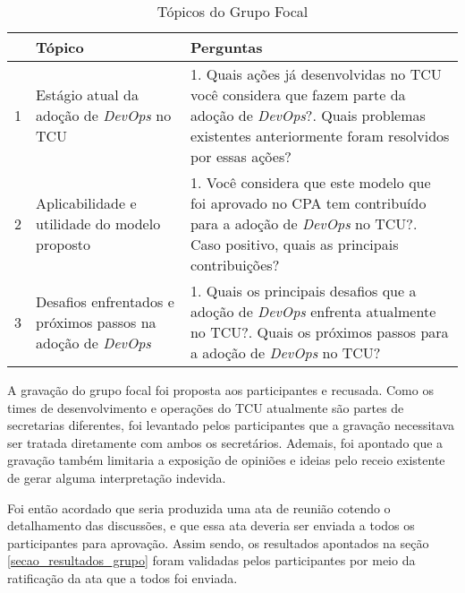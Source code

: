 \begin{table}[hb!]
\centering
\label{tabela_topicos}
\begin{tabular}{|p{0.3cm}|p{6.4cm}|p{7cm}|} \hline
& \textbf{Tópico} & \textbf{Perguntas} \\ \hline

1 & Estágio atual da adoção de {\it DevOps} no \acrshort{TCU} &
1. Quais ações já desenvolvidas no \acrshort{TCU} você considera que fazem parte da adoção de {\it DevOps}?\newline\newline
2. Quais problemas existentes anteriormente foram resolvidos por essas ações? \\ \hline

2 & Aplicabilidade e utilidade do modelo proposto &
1. Você considera que este modelo que foi aprovado no \acrshort{CPA} tem contribuído para a adoção de {\it DevOps} no \acrshort{TCU}?\newline\newline
2. Caso positivo, quais as principais contribuições? \\ \hline

3 & Desafios enfrentados e próximos passos na adoção de {\it DevOps} &
1. Quais os principais desafios que a adoção de {\it DevOps} enfrenta atualmente no \acrshort{TCU}?\newline\newline
2. Quais os próximos passos para a adoção de {\it DevOps} no \acrshort{TCU}?\\ \hline

\end{tabular}
\caption{Tópicos do Grupo Focal}
\end{table}

A gravação do grupo focal foi proposta aos participantes e recusada.
Como os times de desenvolvimento e operações do \acrshort{TCU} atualmente são
partes de secretarias diferentes, foi levantado pelos participantes que a
gravação necessitava ser tratada diretamente com ambos os secretários. Ademais,
foi apontado que a gravação também limitaria a exposição de opiniões e ideias
pelo receio existente de gerar alguma interpretação indevida.

Foi então acordado que seria produzida uma ata de reunião cotendo o detalhamento
das discussões, e que essa ata deveria ser enviada a todos os participantes para
aprovação. Assim sendo, os resultados apontados na seção \ref{secao_resultados_grupo}
foram validadas pelos participantes por meio da ratificação da ata que a todos
foi enviada.

